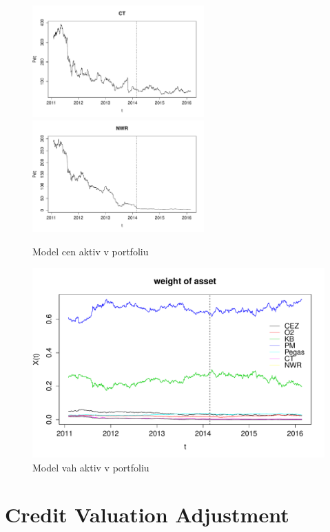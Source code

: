 \documentclass[a4paper,12pt]{report}
\theoremstyle{definition} \newtheorem{definice}[veta]{Definice}
\theoremstyle{remark}
\begin{document}
\begin{figure}[!htbp]
	\includegraphics[width=6.6cm, clip, trim= 0 15 25 0]{IMG/ds_ct_v4.pdf}\\
	\includegraphics[width=6.6cm, clip, trim= 0 15 25 0]{IMG/ds_nwr_v4.pdf}	
  \caption{Model cen aktiv v portfoliu}  \label{price_of_asset}
\end{figure}

\begin{figure}[!htbp]
  \centering 
	\includegraphics[width=13.5cm, clip, trim= 0 15 25 50]{IMG/ds_weight_of_asset_v5.pdf}
  \caption{Model vah aktiv v portfoliu}  \label{weight_of_asset}
\end{figure}


\chapter{Credit Valuation Adjustment}
\end{document}
